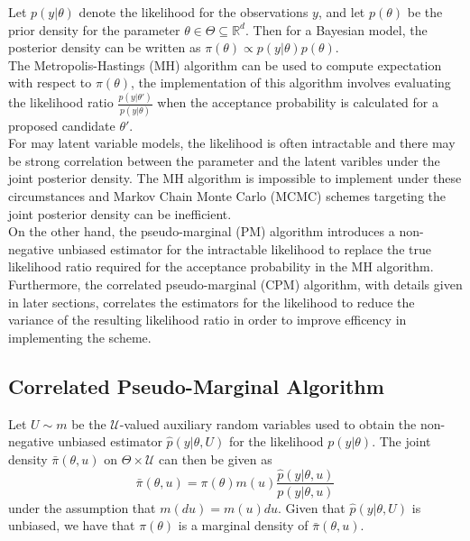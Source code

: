 \documentclass{article}
\begin{document}
  Let $p(y|\theta)$ denote the likelihood for the observations $y$, and let $p(\theta)$ be the prior density for the parameter $\theta \in \Theta \subseteq \mathbb{R}^{d}$. Then for a Bayesian model, the posterior density can be written as $\pi (\theta) \propto p(y|\theta) p(\theta)$. \\

  The Metropolis-Hastings (MH) algorithm can be used to compute expectation with respect to $\pi(\theta)$, the implementation of this algorithm involves evaluating the likelihood ratio $\frac{p(y| \theta')}{p(y| \theta)}$ when the acceptance probability is calculated for a proposed candidate $\theta'$. \\

  For may latent variable models, the likelihood is often intractable and there may be strong correlation between the parameter and the latent varibles under the joint posterior density. The MH algorithm is impossible to implement under these circumstances and Markov Chain Monte Carlo (MCMC) schemes targeting the joint posterior density can be inefficient. \\

  On the other hand, the pseudo-marginal (PM) algorithm introduces a non-negative unbiased estimator for the intractable likelihood to replace the true likelihood ratio required for the acceptance probability in the MH algorithm. Furthermore, the correlated pseudo-marginal (CPM) algorithm, with details given in later sections, correlates the estimators for the likelihood to reduce the variance of the resulting likelihood ratio in order to improve efficency in implementing the scheme.





    \subsection{Correlated Pseudo-Marginal Algorithm}

    Let $U \sim m$ be the $\mathcal{U}$-valued auxiliary random variables used to obtain the non-negative unbiased estimator $\hat{p} (y | \theta, U)$ for the likelihood $p(y | \theta)$. The joint density $\bar{\pi} (\theta, u)$ on $\Theta \times \mathcal{U}$ can then be given as
    $$\bar{\pi} (\theta, u) = \pi (\theta) m(u) \frac{\hat{p}(y|\theta,u)}{p(y|\theta,u)}$$
under the assumption that $m(du)= m(u) du$. Given that $\hat{p} (y | \theta, U)$ is unbiased, we have that $\pi(\theta)$ is a marginal density of $\bar{\pi} (\theta, u)$.
\end{document}
